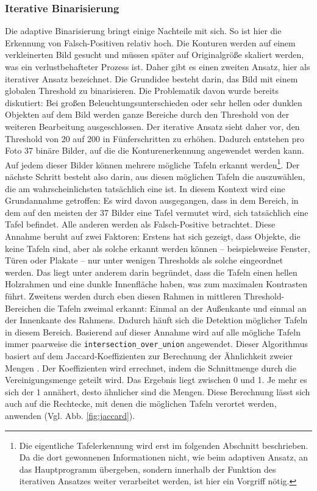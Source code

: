 \subsubsection*{Iterative Binarisierung}

Die adaptive Binarisierung bringt einige Nachteile mit sich. So ist hier die Erkennung von Falsch-Positiven relativ hoch. Die Konturen werden auf einem verkleinerten Bild gesucht und müssen später auf Originalgröße skaliert werden, was ein verlustbehafteter Prozess ist. Daher gibt es einen zweiten Ansatz, hier als iterativer Ansatz bezeichnet. Die Grundidee besteht darin, das Bild mit einem globalen Threshold zu binarisieren. Die Problematik davon wurde bereits diskutiert: Bei großen Beleuchtungsunterschieden oder sehr hellen oder dunklen Objekten auf dem Bild werden ganze Bereiche durch den Threshold von der weiteren Bearbeitung ausgeschlossen. Der iterative Ansatz sieht daher vor, den Threshold von 20 auf 200 in Fünferschritten zu erhöhen. Dadurch entstehen pro Foto 37 binäre Bilder, auf die die Konturenerkennung angewendet werden kann. Auf jedem dieser Bilder können mehrere mögliche Tafeln erkannt werden\footnote{Die eigentliche Tafelerkennung wird erst im folgenden Abschnitt beschrieben. Da die dort gewonnenen Informationen nicht, wie beim adaptiven Ansatz, an das Hauptprogramm übergeben, sondern innerhalb der Funktion des iterativen Ansatzes weiter verarbeitet werden, ist hier ein Vorgriff nötig.}. Der nächste Schritt besteht also darin, aus diesen möglichen Tafeln die auszuwählen, die am wahrscheinlichsten tatsächlich eine ist. In diesem Kontext wird eine Grundannahme getroffen: Es wird davon ausgegangen, dass in dem Bereich, in dem auf den meisten der 37 Bilder eine Tafel vermutet wird, sich tatsächlich eine Tafel befindet. Alle anderen werden als Falsch-Positive betrachtet. Diese Annahme beruht auf zwei Faktoren: Erstens hat sich gezeigt, dass Objekte, die keine Tafeln sind, aber als solche erkannt werden können -- beispielsweise Fenster, Türen oder Plakate -- nur unter wenigen Thresholds als solche eingeordnet werden. Das liegt unter anderem darin begründet, dass die Tafeln einen hellen Holzrahmen und eine dunkle Innenfläche haben, was zum maximalen Kontrasten führt. Zweitens werden durch eben diesen Rahmen in mittleren Threshold-Bereichen die Tafeln zweimal erkannt: Einmal an der Außenkante und einmal an der Innenkante des Rahmens. Dadurch häuft sich die Detektion möglicher Tafeln in diesem Bereich.
Basierend auf dieser Annahme wird auf alle mögliche Tafeln immer paarweise die \verb|intersection_over_union| angewendet. Dieser Algorithmus basiert auf dem Jaccard-Koeffizienten zur Berechnung der Ähnlichkeit zweier Mengen \cite{intersectionoverunion}. Der Koeffizienten wird errechnet, indem die Schnittmenge durch die Vereinigungsmenge geteilt wird. Das Ergebnis liegt zwischen 0 und 1. Je mehr es sich der 1 annähert, desto ähnlicher sind die Mengen. Diese Berechnung lässt sich auch auf die Rechtecke, mit denen die möglichen Tafeln verortet werden, anwenden (Vgl. Abb. \ref{fig:jaccard}).


